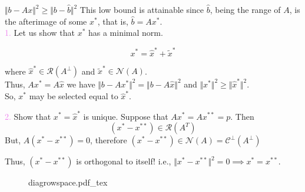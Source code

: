 \documentclass[aspectratio=169]{beamer}
\newcommand{\incfig}[2][1]{%
    \def\svgwidth{#1\columnwidth}
    {#2.pdf_tex} }
\begin{document}
\begin{frame}{}  %
	
	$\Vert b- Ax \Vert^2 \geq  \Vert b - \hat{b} \Vert^2$ This low bound is attainable since $\hat{b}$, being the range of $A$, is the afterimage of some $x^\ast$, that is, $\hat{b}= A x^\ast$.\\
	\vspace*{5mm}
	\textcolor{violet}{1.} Let us show that $x^\ast$ has a minimal norm.
	
	\[ x^\ast = \hat{x}^\ast + \tilde{x}^\ast \]
	
	\noindent where $\hat{x}^\ast \in \mathcal{R}(A^\perp)$ and $\tilde{x}^\ast \in \mathcal{N}(A)$.\\
	\vspace*{5mm}	
	Thus, $A x^\ast = A\hat{x}$ we have $\Vert b- Ax^\ast \Vert^2 = \Vert b- A \hat{x} \Vert^2$ and $\Vert x^\ast \Vert^2 \geq \Vert \hat{x}^\ast \Vert^2 $.\\
	\vspace*{5mm}
	{\color{violet} So, $x^\ast$ may be selected equal to $\hat{x}^\ast.$ }
\end{frame}

\begin{frame}{} %
	

	\textcolor{violet}{2.} Show that $x^\ast = \hat{x}^\ast$ is unique. Suppose that $A x^\ast = A x^{\ast\ast}= p$. Then
	\[ (x^\ast - x^{\ast\ast} ) \in \mathcal{R}(A^T) \]
	But, $A(x^\ast - x^{\ast\ast} ) = 0$, therefore $ (x^\ast - x^{\ast\ast} ) \in \mathcal{N}(A) = \mathcal{C^\perp}(A^\perp) $
	
	Thus, $(x^\ast - x^{\ast\ast} )$ is orthogonal to itself! i.e., $\Vert x^\ast  - x^{\ast\ast} \Vert^2 = 0 \implies x^\ast = x^{\ast\ast}. $
\begin{figure}[ht]
    \centering
    \incfig[0.8]{diagrowspace}
    \label{fig:diagrowspace}
\end{figure}
\end{frame}
\end{document}

